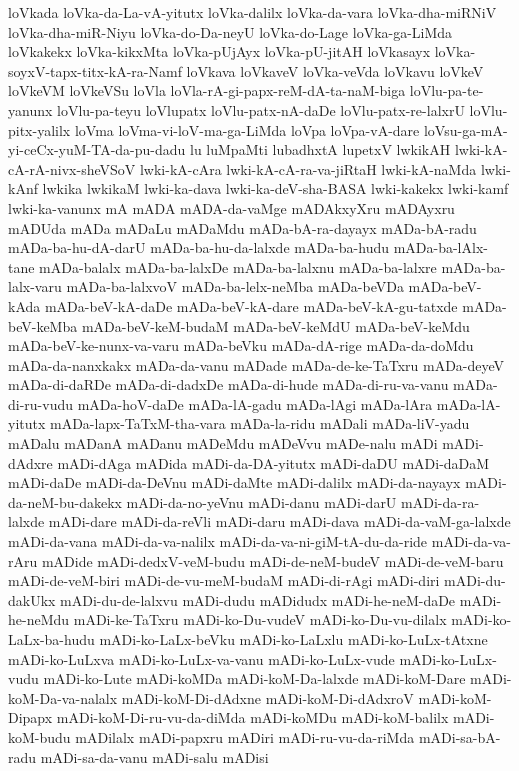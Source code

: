 {loVkada
loVka-da-La-vA-yitutx
loVka-dalilx
loVka-da-vara
loVka-dha-miRNiV
loVka-dha-miR-Niyu
loVka-do-Da-neyU
loVka-do-Lage
loVka-ga-LiMda
loVkakekx
loVka-kikxMta
loVka-pUjAyx
loVka-pU-jitAH
loVkasayx
loVka-soyxV-tapx-titx-kA-ra-Namf
loVkava
loVkaveV
loVka-veVda
loVkavu
loVkeV
loVkeVM
loVkeVSu
loVla
loVla-rA-gi-papx-reM-dA-ta-naM-biga
loVlu-pa-te-yanunx
loVlu-pa-teyu
loVlupatx
loVlu-patx-nA-daDe
loVlu-patx-re-lalxrU
loVlu-pitx-yalilx
loVma
loVma-vi-loV-ma-ga-LiMda
loVpa
loVpa-vA-dare
loVsu-ga-mA-yi-ceCx-yuM-TA-da-pu-dadu
lu
luMpaMti
lubadhxtA
lupetxV
lwkikAH
lwki-kA-cA-rA-nivx-sheVSoV
lwki-kA-cAra
lwki-kA-cA-ra-va-jiRtaH
lwki-kA-naMda
lwki-kAnf
lwkika
lwkikaM
lwki-ka-dava
lwki-ka-deV-sha-BASA
lwki-kakekx
lwki-kamf
lwki-ka-vanunx
mA
mADA
mADA-da-vaMge
mADAkxyXru
mADAyxru
mADUda
mADa
mADaLu
mADaMdu
mADa-bA-ra-dayayx
mADa-bA-radu
mADa-ba-hu-dA-darU
mADa-ba-hu-da-lalxde
mADa-ba-hudu
mADa-ba-lAlx-tane
mADa-balalx
mADa-ba-lalxDe
mADa-ba-lalxnu
mADa-ba-lalxre
mADa-ba-lalx-varu
mADa-ba-lalxvoV
mADa-ba-lelx-neMba
mADa-beVDa
mADa-beV-kAda
mADa-beV-kA-daDe
mADa-beV-kA-dare
mADa-beV-kA-gu-tatxde
mADa-beV-keMba
mADa-beV-keM-budaM
mADa-beV-keMdU
mADa-beV-keMdu
mADa-beV-ke-nunx-va-varu
mADa-beVku
mADa-dA-rige
mADa-da-doMdu
mADa-da-nanxkakx
mADa-da-vanu
mADade
mADa-de-ke-TaTxru
mADa-deyeV
mADa-di-daRDe
mADa-di-dadxDe
mADa-di-hude
mADa-di-ru-va-vanu
mADa-di-ru-vudu
mADa-hoV-daDe
mADa-lA-gadu
mADa-lAgi
mADa-lAra
mADa-lA-yitutx
mADa-lapx-TaTxM-tha-vara
mADa-la-ridu
mADali
mADa-liV-yadu
mADalu
mADanA
mADanu
mADeMdu
mADeVvu
mADe-nalu
mADi
mADi-dAdxre
mADi-dAga
mADida
mADi-da-DA-yitutx
mADi-daDU
mADi-daDaM
mADi-daDe
mADi-da-DeVnu
mADi-daMte
mADi-dalilx
mADi-da-nayayx
mADi-da-neM-bu-dakekx
mADi-da-no-yeVnu
mADi-danu
mADi-darU
mADi-da-ra-lalxde
mADi-dare
mADi-da-reVli
mADi-daru
mADi-dava
mADi-da-vaM-ga-lalxde
mADi-da-vana
mADi-da-va-nalilx
mADi-da-va-ni-giM-tA-du-da-ride
mADi-da-va-rAru
mADide
mADi-dedxV-veM-budu
mADi-de-neM-budeV
mADi-de-veM-baru
mADi-de-veM-biri
mADi-de-vu-meM-budaM
mADi-di-rAgi
mADi-diri
mADi-du-dakUkx
mADi-du-de-lalxvu
mADi-dudu
mADidudx
mADi-he-neM-daDe
mADi-he-neMdu
mADi-ke-TaTxru
mADi-ko-Du-vudeV
mADi-ko-Du-vu-dilalx
mADi-ko-LaLx-ba-hudu
mADi-ko-LaLx-beVku
mADi-ko-LaLxlu
mADi-ko-LuLx-tAtxne
mADi-ko-LuLxva
mADi-ko-LuLx-va-vanu
mADi-ko-LuLx-vude
mADi-ko-LuLx-vudu
mADi-ko-Lute
mADi-koMDa
mADi-koM-Da-lalxde
mADi-koM-Dare
mADi-koM-Da-va-nalalx
mADi-koM-Di-dAdxne
mADi-koM-Di-dAdxroV
mADi-koM-Dipapx
mADi-koM-Di-ru-vu-da-diMda
mADi-koMDu
mADi-koM-balilx
mADi-koM-budu
mADilalx
mADi-papxru
mADiri
mADi-ru-vu-da-riMda
mADi-sa-bA-radu
mADi-sa-da-vanu
mADi-salu
mADisi
}
